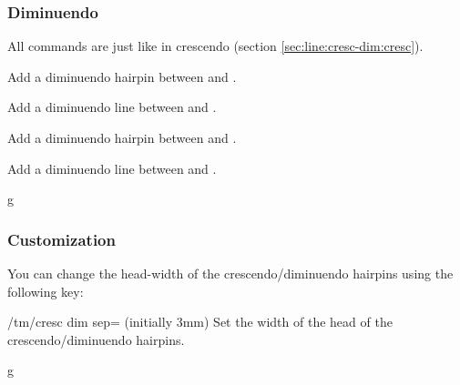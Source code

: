 \subsubsection{Diminuendo}\label{sec:line:cresc-dim:dim}
All commands are just like in crescendo (section \ref{sec:line:cresc-dim:cresc}).
\begin{command}{\tmdiminuendo{}}
  Add a diminuendo hairpin between  and .
\end{command}
\begin{command}{\tmdiminuendo*{}}
  Add a diminuendo line between  and .
\end{command}
\begin{command}{\tmdiminuendoline{}}
  Add a diminuendo hairpin between  and .
\end{command}
\begin{command}{\tmdiminuendoline*{}}
  Add a diminuendo line between  and .
\end{command}
\begin{codeexample}[]
\begin{tmline}
\begin{tmstaff}{g}{}
\end{tmstaff}
\end{tmline}
\end{codeexample}
\subsubsection{Customization}\label{sec:line:cresc-dim:custom}
You can change the head-width of the crescendo/diminuendo hairpins using the 
following key:
\begin{key}{/tm/cresc dim sep= (initially 3mm)}
  Set the width of the head of the crescendo/diminuendo hairpins.
\end{key}
\begin{codeexample}[]
\begin{tmline}
\begin{tmstaff}{g}{}
\end{tmstaff}
\end{tmline}
\end{codeexample}
